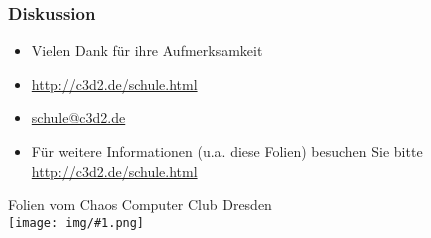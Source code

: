 \documentclass[table]{beamer}
\newcommand{\cc}[1]{\texttt{[image: img/\#1.png]}}
\begin{document}
\begin{frame}
    \frametitle{Diskussion}
    \begin{itemize}
        \item Vielen Dank für ihre Aufmerksamkeit
        \item \url{http://c3d2.de/schule.html}
        \item \url{schule@c3d2.de}
        \item Für weitere Informationen (u.a. diese Folien) besuchen Sie bitte \url{http://c3d2.de/schule.html}
    \end{itemize}
    \begin{center}
   Folien vom Chaos Computer Club Dresden\\
   {\cc{by-sa}}
   \end{center}
\end{frame}
\end{document}
